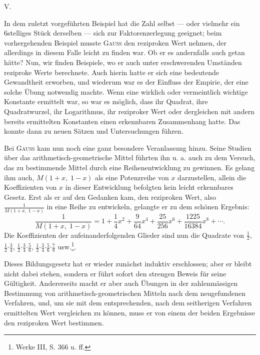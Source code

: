 \clearpage\begingroup
{}
\renewcommand{\thefootnote}{\arabic{footnote})}\setcounter{footnote}{0}
\begin{center}V.\\[3pt]{\large{}}\end{center}
\noindent\hspace*{\parindent}In dem zuletzt vorgeführten Beispiel hat die Zahl selbst — oder vielmehr ein 6stelliges Stück derselben — sich zur Faktorenzerlegung geeignet;
beim vorhergehenden Beispiel musste \textsc{Gauss} den reziproken Wert nehmen,
der allerdings in diesem Falle leicht zu finden war. Ob er es andernfalls
auch getan hätte? Nun, wir finden Beispiele, wo er auch unter erschwerenden
Umständen reziproke Werte berechnete. Auch hierin hatte er sich eine bedeutende Gewandtheit erworben, und wiederum war es der Einfluss der Empirie, der eine solche Übung notwendig machte. Wenn eine wirklich oder
vermeintlich wichtige Konstante ermittelt war, so war es möglich, dass ihr
Quadrat, ihre Quadratwurzel, ihr Logarithmus, ihr reziproker Wert oder dergleichen mit andern bereits ermittelten Konstanten einen erkennbaren
\clearpage{}
\noindent Zusammenhang hatte. Das konnte dann zu neuen Sätzen und Untersuchungen
führen.

Bei \textsc{Gauss} kam nun noch eine ganz besondere Veranlassung hinzu. Seine
Studien über das arithmetisch-geometrische Mittel führten ihn u. a. auch zu
dem Versuch, das zu bestimmende Mittel durch eine Reihenentwicklung zu
gewinnen. Es gelang ihm auch, $M(1+x,\;1-x)$ als eine Potenzreihe von $x$
darzustellen, allein die Koeffizienten von $x$ in dieser Entwicklung befolgten
kein leicht erkennbares Gesetz. Erst als er auf den Gedanken kam, den reziproken Wert, also $\frac{1}{M(1+x,\;1-x)}$ in eine Reihe zu entwickeln, gelangte er zu
dem schönen Ergebnis:
\[
\frac{1}{M(1+x,\;1-x)}=1+\frac14x^2+\frac9{64}x^4+\frac{25}{256}x^6+\frac{1225}{16384}x^8+\cdots.
\]
\noindent Die Koeffizienten der aufeinanderfolgenden Glieder sind nun die Quadrate
von $\frac12$, $\frac12\mathord{\cdot}\frac34$, $\frac12\mathord{\cdot}\frac34\mathord{\cdot}\frac56$, $\frac12\mathord{\cdot}\frac34\mathord{\cdot}\frac56\mathord{\cdot}\frac78$ usw.\footnote{Werke III, S. 366 u. ff.}.

Dieses Bildungsgesetz hat er wieder zunächst induktiv erschlossen; aber
er bleibt nicht dabei stehen, sondern er führt sofort den strengen Beweis für
seine Gültigkeit. Andererseits macht er aber auch Übungen in der zahlenmässigen Bestimmung von arithmetisch-geometrischen Mitteln nach dem neugefundenen Verfahren, und, um sie mit dem entsprechenden, nach dem seitherigen Verfahren ermittelten Wert vergleichen zu können, muss er von einem
der beiden Ergebnisse den reziproken Wert bestimmen.

